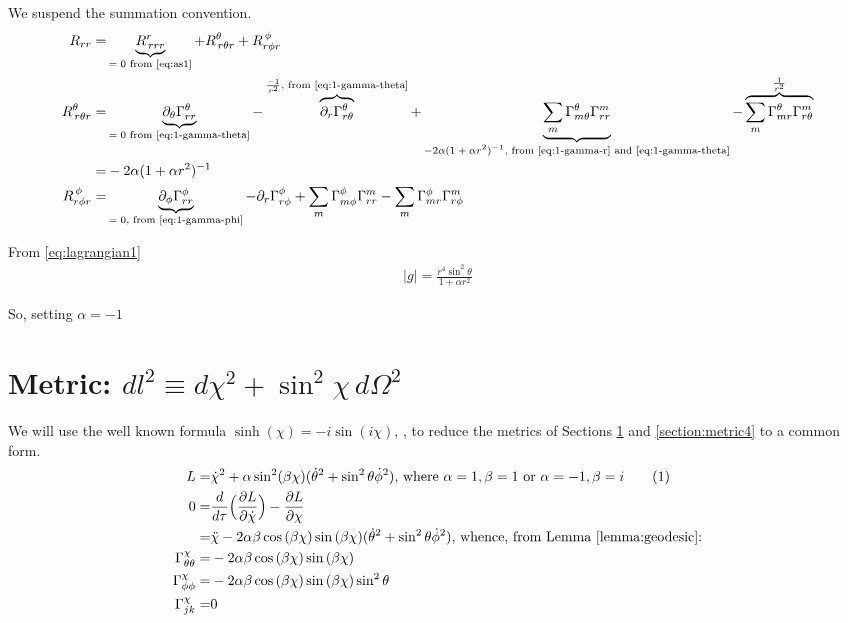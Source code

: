 \documentclass[]{article}
\newcommand\numberthis{\addtocounter{equation}{1}\tag{\theequation}}
\begin{document}
We suspend the summation convention.
\begin{align*}
R_{rr}=&\underbrace{R^r_{\,rrr}}_\text{$=0$ from \eqref{eq:as1}}+R^{\theta}_{\,r\theta r}+R^{\,\phi}_{r\phi r}\\
R^{\theta}_{\,r\theta r}=&\underbrace{\partial_{\theta}\Gamma^{\theta}_{rr}}_\text{$=0$ from \eqref{eq:1-gamma-theta}}-\overbrace{\partial_r\Gamma^{\theta}_{r\theta}}^\text{$\frac{-1}{r^2}$, from \eqref{eq:1-gamma-theta}}+\underbrace{\sum_m\Gamma^{\theta}_{m\theta}\Gamma^{m}_{rr}}_\text{$-2 \alpha (1+\alpha r^2)^{-1}$, from \eqref{eq:1-gamma-r} and \eqref{eq:1-gamma-theta}}-\overbrace{\sum_m\Gamma^{\theta}_{mr}\Gamma^m_{r\theta}}^\text{$\frac{1}{r^2}$}\\
=&-2 \alpha (1+\alpha r^2)^{-1}\\
R^{\,\phi}_{r\phi r}=&\underbrace{\partial_{\phi}\Gamma^{\phi}_{rr}}_\text{$=0$, from \eqref{eq:1-gamma-phi}}-\partial_r\Gamma^{\phi}_{r\phi}+\sum_m\Gamma^{\phi}_{m\phi}\Gamma^{m}_{rr}-\sum_m\Gamma^{\phi}_{mr}\Gamma^m_{r\phi}
\end{align*}










From \eqref{eq:lagrangian1}
\begin{align*}
|g|=\frac{r^4\sin^2 \theta}{1+\alpha r^2}
\end{align*}





So, setting $\alpha=-1$
\section{Metric: $dl^2\equiv d\chi^2+\sin^2 \chi\,d\Omega^2$} \label{section:metric2}
We will use the well known formula $\sinh(\chi)=-i \sin(i\chi)$, \cite{wiki:sinh}, to reduce the metrics of Sections \ref{section:metric2} and \ref{section:metric4} to a common form.
\begin{align*}
L=&\dot{\chi}^2 + \alpha \sin^2(\beta \chi)(\dot\theta^2 + \sin^2 \theta \dot \phi^2)\text{, where $\alpha=1,\beta=1$ or $\alpha=-1,\beta=i$} \numberthis \label{eq:lagrangian2}\\
0=&\frac{d}{d \tau}\Big(\frac{\partial L}{\partial \dot{\chi}}\Big)-\frac{\partial L}{\partial \chi}\\
=&\ddot{\chi}-2\alpha\beta \cos{(\beta\chi)}\sin{(\beta\chi)}(\dot\theta^2 + \sin^2 \theta \dot \phi^2)\text{, whence, from Lemma \ref{lemma:geodesic}:}\\
\Gamma^{\chi}_{\theta\theta}=&-2\alpha\beta \cos{(\beta\chi)}\sin{(\beta\chi)}\\
\Gamma^{\chi}_{\phi\phi}=&-2\alpha\beta \cos{(\beta\chi)}\sin{(\beta\chi)}\sin^2 \theta\\
\Gamma^{\chi}_{jk}=&0
\end{align*}
\end{document}
